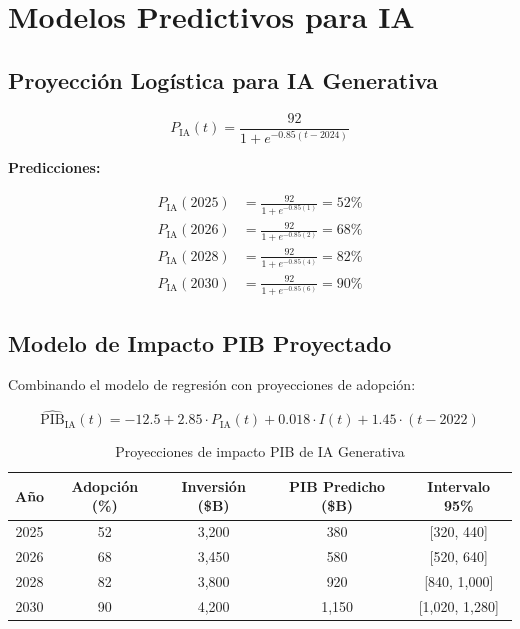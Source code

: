 \documentclass{article}
\begin{document}
\section{Modelos Predictivos para IA}

\subsection{Proyección Logística para IA Generativa}

\begin{equation}
P_{\text{IA}}(t) = \frac{92}{1 + e^{-0.85(t - 2024)}}
\end{equation}

\textbf{Predicciones:}

\begin{align}
P_{\text{IA}}(2025) &= \frac{92}{1 + e^{-0.85(1)}} = 52\% \\
P_{\text{IA}}(2026) &= \frac{92}{1 + e^{-0.85(2)}} = 68\% \\
P_{\text{IA}}(2028) &= \frac{92}{1 + e^{-0.85(4)}} = 82\% \\
P_{\text{IA}}(2030) &= \frac{92}{1 + e^{-0.85(6)}} = 90\%
\end{align}

\subsection{Modelo de Impacto PIB Proyectado}

Combinando el modelo de regresión con proyecciones de adopción:

\begin{equation}
\widehat{\text{PIB}}_{\text{IA}}(t) = -12.5 + 2.85 \cdot P_{\text{IA}}(t) + 0.018 \cdot I(t) + 1.45 \cdot (t - 2022)
\end{equation}

\begin{table}[h]
\centering
\begin{tabular}{|c|c|c|c|c|}
\hline
\textbf{Año} & \textbf{Adopción (\%)} & \textbf{Inversión (\$B)} & \textbf{PIB Predicho (\$B)} & \textbf{Intervalo 95\%} \\
\hline
2025 & 52 & 3,200 & 380 & [320, 440] \\
2026 & 68 & 3,450 & 580 & [520, 640] \\
2028 & 82 & 3,800 & 920 & [840, 1,000] \\
2030 & 90 & 4,200 & 1,150 & [1,020, 1,280] \\
\hline
\end{tabular}
\caption{Proyecciones de impacto PIB de IA Generativa}
\end{table}
\end{document}
